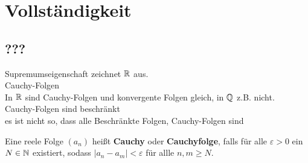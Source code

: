 \section{Vollständigkeit}
\subsection{???}
Supremumseigenschaft zeichnet $ \mathbb{R} $ aus.\\
Cauchy-Folgen\\
In $ \mathbb{R} $ sind Cauchy-Folgen und konvergente Folgen gleich, in $ \mathbb{Q} $ z.B. nicht.\\
Cauchy-Folgen sind beschränkt\\
es ist nicht so, dass alle Beschränkte Folgen, Cauchy-Folgen sind\\
\begin{subdefinition}[Cauchyfolge]
	Eine reele Folge $(a_n)$ heißt \textbf{Cauchy} oder \textbf{Cauchyfolge}, falls für alle $\varepsilon > 0 $ ein $ N \in \mathbb{N} $ existiert, sodass $ |a_n - a_m| < \varepsilon $ für allle $ n, m \geq N $.
\end{subdefinition}

